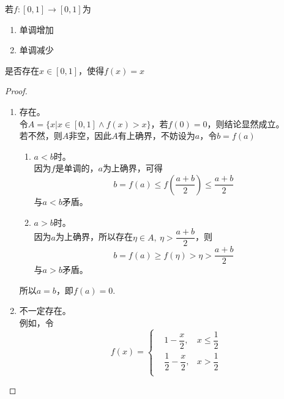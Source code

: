 \begin{proposition}

    若$f:[0,1] \to [0,1]$为

    \begin{enumerate}

            \item 单调增加
            
            \item 单调减少

    \end{enumerate}

    是否存在$x \in [0,1]$，使得$f(x) = x$

\end{proposition}

\begin{proof}

    \begin{enumerate}

        \item 
            存在。\\
            令$A = \{x | x \in [0,1] \land f(x) > x \} $，若$f(0) = 0$，则结论显然成立。\\
            若不然，则$A$非空，因此$A$有上确界，不妨设为$a$，令$b = f(a)$

            \begin{enumerate}

                \item $a<b$时。\\
                    因为$f$是单调的，$a$为上确界，可得
                    $$b = f(a) \leq f\left(\dfrac{a+b}{2}\right) \leq \dfrac{a + b}{2}$$
                    与$a<b$矛盾。

                \item 
                    $a>b$时。\\
                    因为$a$为上确界，所以存在$\eta \in A, \ \eta > \dfrac{a + b}{2}$，则
                    $$b = f(a) \geq f(\eta) > \eta > \dfrac{a + b}{2}$$
                    与$a>b$矛盾。

            \end{enumerate}

            所以$a=b$，即$f(a) = 0$.
        
        \item 
            不一定存在。\\
            例如，令
            $$f(x) = \left\{
                \begin{aligned}
                    & 1 - \dfrac{x}{2}, &x \leq \dfrac{1}{2} \\
                    & \dfrac{1}{2} - \dfrac{x}{2} , &x > \dfrac{1}{2} \\
                \end{aligned}
                \right.
            $$
            
    \end{enumerate}

\end{proof}

